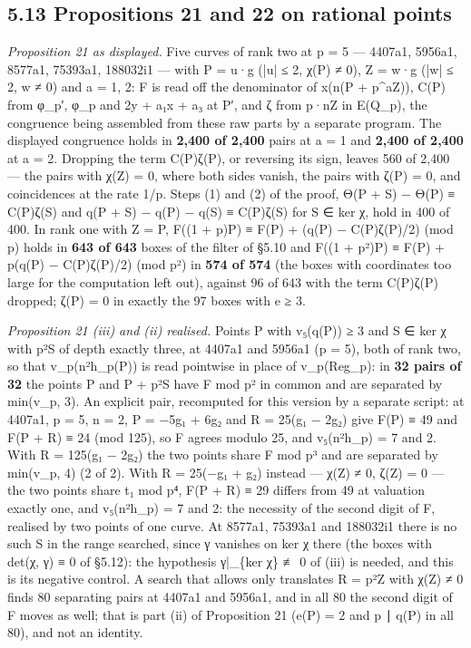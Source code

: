 \documentclass[11pt,a4paper]{article}
\theoremstyle{named}
\begin{document}
\subsection*{5.13 Propositions 21 and 22 on rational points}

\textit{Proposition 21 as displayed.} Five curves of rank two at p = 5 — 4407a1, 5956a1, 8577a1, 75393a1, 188032i1 — with P = u·g (|u| ≤ 2, χ(P) ≠ 0), Z = w·g (|w| ≤ 2, w ≠ 0) and a = 1, 2: F is read off the denominator of x(n(P + p\textasciicircum{}aZ)), C(P) from φ\_p′, φ\_p and 2y + a₁x + a₃ at P′, and ζ from p·nZ in E(Q\_p), the congruence being assembled from these raw parts by a separate program. The displayed congruence holds in \textbf{2,400 of 2,400} pairs at a = 1 and \textbf{2,400 of 2,400} at a = 2. Dropping the term C(P)ζ(P), or reversing its sign, leaves 560 of 2,400 — the pairs with χ(Z) = 0, where both sides vanish, the pairs with ζ(P) = 0, and coincidences at the rate 1/p. Steps (1) and (2) of the proof, Θ(P + S) − Θ(P) ≡ C(P)ζ(S) and q(P + S) − q(P) − q(S) ≡ C(P)ζ(S) for S ∈ ker χ, hold in 400 of 400. In rank one with Z = P, F((1 + p)P) ≡ F(P) + (q(P) − C(P)ζ(P)/2) (mod p) holds in \textbf{643 of 643} boxes of the filter of §5.10 and F((1 + p²)P) ≡ F(P) + p(q(P) − C(P)ζ(P)/2) (mod p²) in \textbf{574 of 574} (the boxes with coordinates too large for the computation left out), against 96 of 643 with the term C(P)ζ(P) dropped; ζ(P) = 0 in exactly the 97 boxes with e ≥ 3.

\textit{Proposition 21 (iii) and (ii) realised.} Points P with v₅(q(P)) ≥ 3 and S ∈ ker χ with p²S of depth exactly three, at 4407a1 and 5956a1 (p = 5), both of rank two, so that v\_p(n²h\_p(P)) is read pointwise in place of v\_p(Reg\_p): in \textbf{32 pairs of 32} the points P and P + p²S have F mod p² in common and are separated by min(v\_p, 3). An explicit pair, recomputed for this version by a separate script: at 4407a1, p = 5, n = 2, P = −5g₁ + 6g₂ and R = 25(g₁ − 2g₂) give F(P) ≡ 49 and F(P + R) ≡ 24 (mod 125), so F agrees modulo 25, and v₅(n²h\_p) = 7 and 2. With R = 125(g₁ − 2g₂) the two points share F mod p³ and are separated by min(v\_p, 4) (2 of 2). With R = 25(−g₁ + g₂) instead — χ(Z) ≠ 0, ζ(Z) = 0 — the two points share t₁ mod p⁴, F(P + R) ≡ 29 differs from 49 at valuation exactly one, and v₅(n²h\_p) = 7 and 2: the necessity of the second digit of F, realised by two points of one curve. At 8577a1, 75393a1 and 188032i1 there is no such S in the range searched, since γ vanishes on ker χ there (the boxes with det(χ, γ) ≡ 0 of §5.12): the hypothesis γ|\_\{ker χ\} ≢ 0 of (iii) is needed, and this is its negative control. A search that allows only translates R = p²Z with χ(Z) ≠ 0 finds 80 separating pairs at 4407a1 and 5956a1, and in all 80 the second digit of F moves as well; that is part (ii) of Proposition 21 (e(P) = 2 and p ∣ q(P) in all 80), and not an identity.
\end{document}
